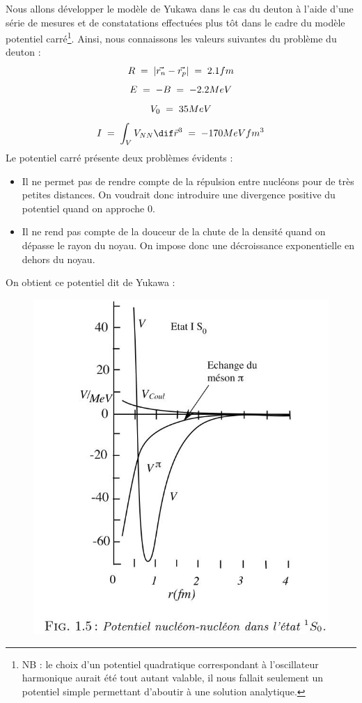 Nous allons développer le modèle de Yukawa dans le cas du deuton à l'aide d'une série de mesures et de constatations effectuées plus tôt dans le cadre du modèle potentiel carré\footnote{NB : le choix d'un potentiel quadratique correspondant à l'oscillateur harmonique aurait été tout autant valable, il nous fallait seulement un potentiel simple permettant d'aboutir à une solution analytique.}. Ainsi, nous connaissons les valeurs suivantes du problème du deuton :
\begin{equation*}
    R \; = \; |\Vec{r_n} - \Vec{r_p}| \; = \; 2.1fm
\end{equation*}
\begin{equation*}
    E \; = \; -B \; = \; -2.2MeV
\end{equation*}
\begin{equation*}
    V_0 \; = \; 35 MeV
\end{equation*}
\begin{equation*}
    I \eq \int_V V_{NN}\dif\vec{r}^3 \eq -170MeVfm^3
\end{equation*}
Le potentiel carré présente deux problèmes évidents :
\begin{itemize}[label = $\bullet$]
    \item Il ne permet pas de rendre compte de la répulsion entre nucléons pour de très petites distances. On voudrait donc introduire une divergence positive du potentiel quand on approche 0.
    \item Il ne rend pas compte de la douceur de la chute de la densité quand on dépasse le rayon du noyau. On impose donc une décroissance exponentielle en dehors du noyau.
\end{itemize}
On obtient ce potentiel dit de Yukawa :
\begin{figure}[H]
    \centering
    \includegraphics[scale =0.42] {Images4/Potentiel_Yukawa.jpg}
\end{figure}
